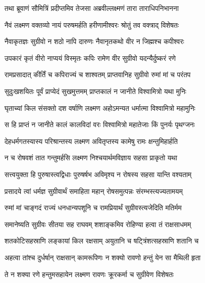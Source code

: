 
\twolineshloka
{तथा ब्रूवाणं सौमित्रिं प्रदीप्तमिव तेजसा}
{अब्रवील्लक्ष्मणं तारा ताराधिपनिभानना} %

\twolineshloka
{नैवं लक्ष्मण वक्तव्यो नायं परुषमर्हति}
{हरीणामीश्वरः श्रोतुं तव वक्त्राद् विशेषतः} %

\twolineshloka
{नैवाकृतज्ञः सुग्रीवो न शठो नापि दारुणः}
{नैवानृतकथो वीर न जिह्मश्च कपीश्वरः} %

\twolineshloka
{उपकारं कृतं वीरो नाप्ययं विस्मृतः कपिः}
{रामेण वीर सुग्रीवो यदन्यैर्दुष्करं रणे} %

\twolineshloka
{रामप्रसादात् कीर्तिं च कपिराज्यं च शाश्वतम्}
{प्राप्तवानिह सुग्रीवो रुमां मां च परंतप} %

\twolineshloka
{सुदुःखशयितः पूर्वं प्राप्येदं सुखमुत्तमम्}
{प्राप्तकालं न जानीते विश्वामित्रो यथा मुनिः} %

\twolineshloka
{घृताच्यां किल संसक्तो दश वर्षाणि लक्ष्मण}
{अहोऽमन्यत धर्मात्मा विश्वामित्रो महामुनिः} %

\twolineshloka
{स हि प्राप्तं न जानीते कालं कालविदां वरः}
{विश्वामित्रो महातेजाः किं पुनर्यः पृथग्जनः} %

\twolineshloka
{देहधर्मगतस्यास्य परिश्रान्तस्य लक्ष्मण}
{अवितृप्तस्य कामेषु रामः क्षन्तुमिहार्हति} %

\twolineshloka
{न च रोषवशं तात गन्तुमर्हसि लक्ष्मण}
{निश्चयार्थमविज्ञाय सहसा प्राकृतो यथा} %

\twolineshloka
{सत्त्वयुक्ता हि पुरुषास्त्वद्विधाः पुरुषर्षभ}
{अविमृश्य न रोषस्य सहसा यान्ति वश्यताम्} %

\twolineshloka
{प्रसादये त्वां धर्मज्ञ सुग्रीवार्थं समाहिता}
{महान् रोषसमुत्पन्नः संरम्भस्त्यज्यतामयम्} %

\twolineshloka
{रुमां मां चाङ्गदं राज्यं धनधान्यपशूनि च}
{रामप्रियार्थं सुग्रीवस्त्यजेदिति मतिर्मम} %

\twolineshloka
{समानेष्यति सुग्रीवः सीतया सह राघवम्}
{शशाङ्कमिव रोहिण्या हत्वा तं राक्षसाधमम्} %

\twolineshloka
{शतकोटिसहस्राणि लङ्कायां किल रक्षसाम्}
{अयुतानि च षट्त्रिंशत्सहस्राणि शतानि च} %

\twolineshloka
{अहत्वा तांश्च दुर्धर्षान् राक्षसान् कामरूपिणः}
{न शक्यो रावणो हन्तुं येन सा मैथिली हृता} %

\twolineshloka
{ते न शक्या रणे हन्तुमसहायेन लक्ष्मण}
{रावणः क्रूरकर्मा च सुग्रीवेण विशेषतः} %

